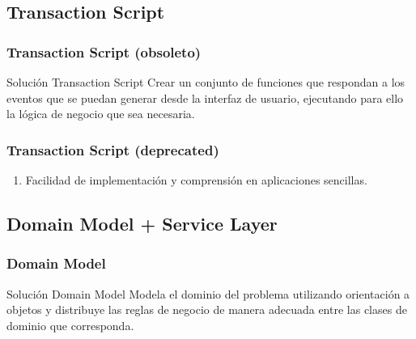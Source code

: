 \documentclass[a4paper,slidestop,xcolor=pst,dvips,blue]{beamer}
\begin{document}
\subsection{Transaction Script}

\begin{frame}[c]
    \frametitle{Transaction Script (obsoleto)}
    \begin{block}{Solución Transaction Script}
        Crear un conjunto de funciones que respondan a los eventos que se puedan generar
        desde la interfaz de usuario, ejecutando para ello la lógica de negocio que sea necesaria.
    \end{block}
\end{frame}

\begin{frame}[c]
    \frametitle{Transaction Script (deprecated)}
    \begin{enumerate}
        \item<2-> Facilidad de implementación y comprensión en aplicaciones sencillas.
    \end{enumerate}
\end{frame}

\subsection{Domain Model + Service Layer}

\begin{frame}[c]
    \frametitle{Domain Model}
    \begin{block}{Solución Domain Model}
        Modela el dominio del problema utilizando orientación a objetos y distribuye las reglas de negocio de manera adecuada entre las clases de dominio que corresponda.
    \end{block}
\end{frame}
\end{document}
